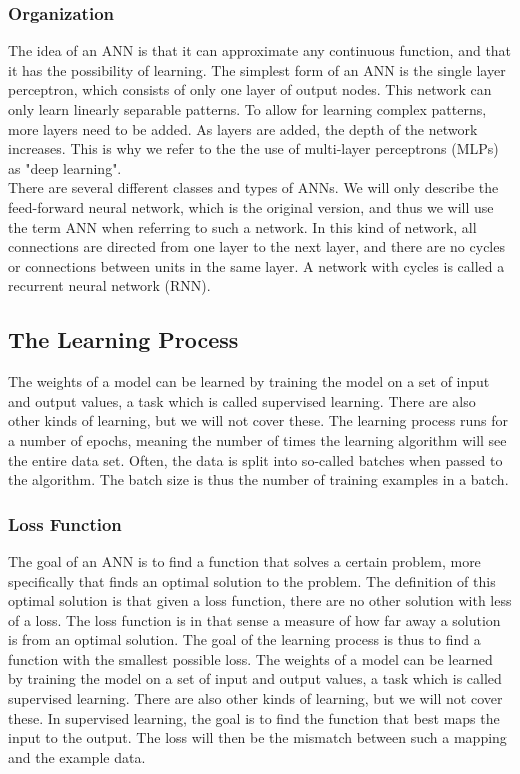 \subsubsection{Organization}

\noindent The idea of an ANN is that it can approximate any continuous function, and that it has the possibility of learning. The simplest form of an ANN is the single layer perceptron, which consists of only one layer of output nodes. This network can only learn linearly separable patterns. To allow for learning complex patterns, more layers need to be added. As layers are added, the depth of the network increases. This is why we refer to the the use of multi-layer perceptrons (MLPs) as "deep learning". \\

\noindent There are several different classes and types of ANNs. We will only describe the feed-forward neural network, which is the original version, and thus we will use the term ANN when referring to such a network. In this kind of network, all connections are directed from one layer to the next layer, and there are no cycles or connections between units in the same layer. A network with cycles is called a recurrent neural network (RNN).

\subsection{The Learning Process}

The weights of a model can be learned by training the model on a set of input and output values, a task which is called supervised learning. There are also other kinds of learning, but we will not cover these. The learning process runs for a number of epochs, meaning the number of times the learning algorithm will see the entire data set. Often, the data is split into so-called batches when passed to the algorithm. The batch size is thus the number of training examples in a batch.

\subsubsection{Loss Function}

\noindent The goal of an ANN is to find a function that solves a certain problem, more specifically that finds an optimal solution to the problem. The definition of this optimal solution is that given a loss function, there are no other solution with less of a loss. The loss function is in that sense a measure of how far away a solution is from an optimal solution. The goal of the learning process is thus to find a function with the smallest possible loss. The weights of a model can be learned by training the model on a set of input and output values, a task which is called supervised learning. There are also other kinds of learning, but we will not cover these. In supervised learning, the goal is to find the function that best maps the input to the output. The loss will then be the mismatch between such a mapping and the example data. \\ 

